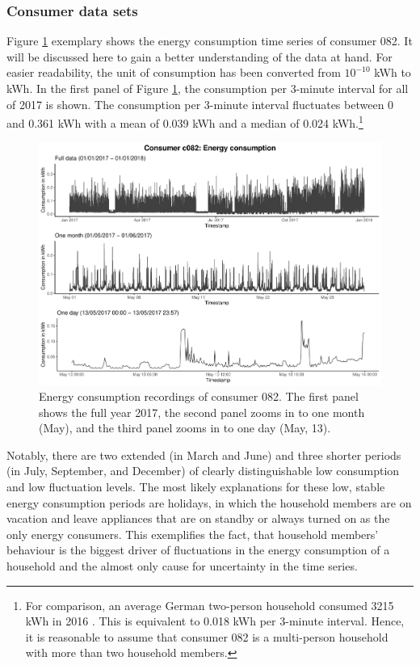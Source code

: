 \subsubsection{Consumer data sets}

Figure \ref{Fig:energycons_c082} exemplary shows the energy consumption time series of consumer 082. It will be discussed here to gain a better understanding of the data at hand. For easier readability, the unit of consumption has been converted from $10^{-10}$ kWh to kWh. In the first panel of Figure \ref{Fig:energycons_c082}, the consumption per 3-minute interval for all of 2017 is shown. The consumption per 3-minute interval fluctuates between 0 and 0.361 kWh with a mean of 0.039 kWh and a median of 0.024 kWh.\footnote{For comparison, an average German two-person household consumed 3215 kWh in 2016 \citep{Destatis:2018}. This is equivalent to 0.018 kWh per 3-minute interval. Hence, it is reasonable to assume that consumer 082 is a multi-person household with more than two household members.}

\begin{figure}[htbp]
 \centering
\includegraphics[width=\textwidth]{thesis/graphs/timeseries/c082_cons.pdf}
\caption[Energy consumption recordings of consumer 082]{Energy consumption recordings of consumer 082. The first panel shows the full year 2017, the second panel zooms in to one month (May), and the third panel zooms in to one day (May, 13). \quantnet}
\label{Fig:energycons_c082}
\end{figure}

Notably, there are two extended (in March and June) and three shorter periods (in July, September, and December) of clearly distinguishable low consumption and low fluctuation levels. The most likely explanations for these low, stable energy consumption periods are holidays, in which the household members are on vacation and leave appliances that are on standby or always turned on as the only energy consumers. This exemplifies the fact, that household members' behaviour is the biggest driver of fluctuations in the energy consumption of a household and the almost only cause for uncertainty in the time series.

